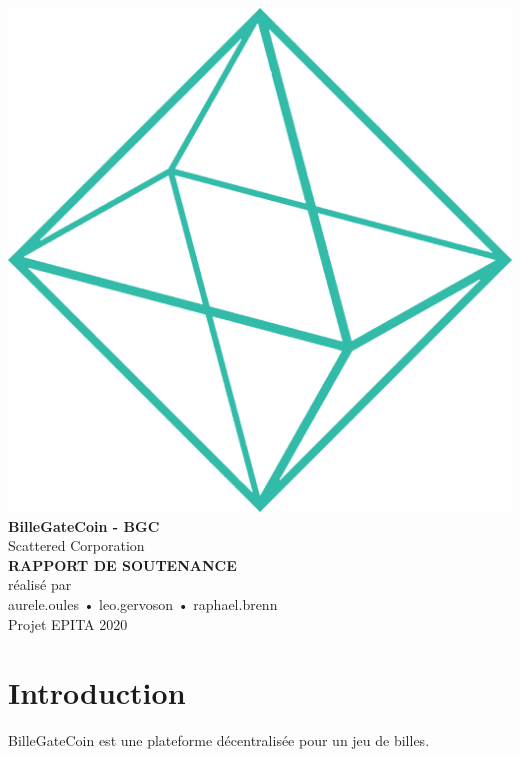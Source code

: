 \documentclass{article}
\begin{document}
\makeatletter
    \begin{titlepage}
        \begin{center}
            \pagecolor{background}
            \color{white}
            \includegraphics[width=0.5\linewidth]{assets/shape.png}\\[10ex]
            {\huge \bfseries BilleGateCoin - BGC}\\[2ex] 
            {\LARGE Scattered Corporation}\\[10ex]
            
            {\huge \bfseries RAPPORT DE SOUTENANCE}\\[5ex]
            \large{réalisé par\\[2ex]aurele.oules  •  leo.gervoson  •  raphael.brenn}\\[16ex] 
            {\large Projet EPITA 2020}
        \end{center}
    \end{titlepage}
\makeatother
\thispagestyle{empty}

\newpage
\begin{center}
\color{white}
\tableofcontents
\end{center}
\newpage
\pagecolor{white}
\sectionfont{\color{greendark}}  %

\fancyhf{}
\renewcommand{\headrulewidth}{0pt}
\renewcommand{\footrulewidth}{1pt}
\newcommand\bold[1]{\textcolor{green}{\bfseries{#1}}}
\newcommand\boldblack[1]{\textcolor{background}{\bfseries{#1}}}
\renewcommand{\footrule}{\hbox to\headwidth{\color{green}\leaders\hrule height \footrulewidth\hfill}}

\rfoot{\thepage}
\pagestyle{fancy}
\renewcommand\seriesdefault{l}

\section{Introduction}
BilleGateCoin est une plateforme décentralisée pour un jeu de billes.
\end{document}
